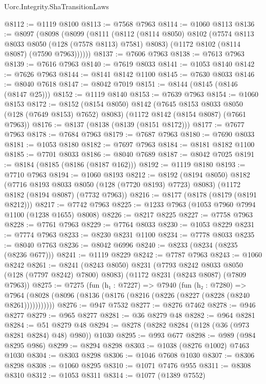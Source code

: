 \begin{lexlean}{Uorc.Integrity.ShaTransitionLaws}
\begin{coremodule}
@8112 := @1119 @8100
@8113 := @7568 @7963
@8114 := @1060 @8113
@8136 := @8097
    (@8098
      (@8099
        (@8111
          (@8112
            (@8114 @8050)
            @8102
            (@7574 @8113 @8033 @8050 (@128 (@7578 @8113) @7581) @8083)
            (@1172 @8102 (@8114 @8087) (@7590 @7963))))))
@8137 := @7606 @7963
@8138 := @7613 @7963
@8139 := @7616 @7963
@8140 := @7619 @8033
@8141 := @1053 @8140
@8142 := @7626 @7963
@8144 := @8141 @8142 @1100
@8145 := @7630 @8033
@8146 := @8040 @7618
@8147 := @8042 @7019
@8151 := @8144 (@8145 (@8146 (@8147 @25)))
@8152 := @1119 @8140
@8153 := @7639 @7963
@8154 := @1060 @8153
@8172 := @8152
    (@8154 @8050)
    @8142
    (@7645 @8153 @8033 @8050 (@128 (@7649 @8153) @7652) @8083)
    (@1172 @8142 (@8154 @8087) (@7661 @7963))
@8176 := @8137 (@8138 (@8139 (@8151 @8172)))
@8177 := @7677 @7963
@8178 := @7684 @7963
@8179 := @7687 @7963
@8180 := @7690 @8033
@8181 := @1053 @8180
@8182 := @7697 @7963
@8184 := @8181 @8182 @1100
@8185 := @7701 @8033
@8186 := @8040 @7689
@8187 := @8042 @7025
@8191 := @8184 (@8185 (@8186 (@8187 @162)))
@8192 := @1119 @8180
@8193 := @7710 @7963
@8194 := @1060 @8193
@8212 := @8192
    (@8194 @8050)
    @8182
    (@7716 @8193 @8033 @8050 (@128 (@7720 @8193) @7723) @8083)
    (@1172 @8182 (@8194 @8087) (@7732 @7963))
@8216 := @8177 (@8178 (@8179 (@8191 @8212)))
@8217 := @7742 @7963
@8225 := @1233 @7963 (@1053 @7960 @7994 @1100 (@1238 @1655) @8008)
@8226 := @8217 @8225
@8227 := @7758 @7963
@8228 := @7761 @7963
@8229 := @7764 @8033
@8230 := @1053 @8229
@8231 := @7774 @7963
@8233 := @8230 @8231 @1100
@8234 := @7778 @8033
@8235 := @8040 @7763
@8236 := @8042 @6996
@8240 := @8233 (@8234 (@8235 (@8236 @677)))
@8241 := @1119 @8229
@8242 := @7787 @7963
@8243 := @1060 @8242
@8261 := @8241
    (@8243 @8050)
    @8231
    (@7793 @8242 @8033 @8050 (@128 (@7797 @8242) @7800) @8083)
    (@1172 @8231 (@8243 @8087) (@7809 @7963))
@8275 := @7275
    (fun (h₁ : @7227) =>
    @7940
      (fun (h₂ : @7280) =>
      @7964 (@8028 (@8096 (@8136 (@8176 (@8216 (@8226 (@8227 (@8228 (@8240 @8261)))))))))))
@8276 := @947 @7532
@8277 := @8276 @7462
@8278 := @946 @8277
@8279 := @965 @8277
@8281 := @36 @8279 @48
@8282 := @964 @8281
@8284 := @51 @8279 @48
@8294 := @8278 (@8282 @8284 (@128 (@36 (@973 @8281 @8284) @48) @980)) @1030
@8295 := @993 @677
@8298 := @989 (@984 @8295 @986)
@8299 := @8294 @8298
@8303 := @1038 (@8276 @1002) @7463 @1030
@8304 := @8303 @8298
@8306 := @1046 @7608 @1030
@8307 := @8306 @8298
@8308 := @1060 @8295
@8310 := @1071 @7476 @955
@8311 := @8308 @8310
@8312 := @1053 @8311
@8314 := @1077 (@1389 @7552)

\end{coremodule}
\end{lexlean}
